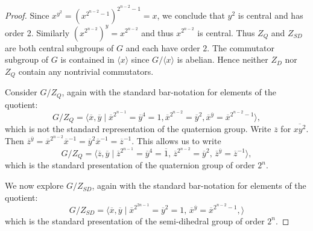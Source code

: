 \documentclass[10pt,a4paper]{amsart}
\begin{document}
\begin{proof}
    Since $x^{y^2} = (x^{2^{n-2}-1})^{2^{n-2}-1} = x$, we conclude that $y^2$ is central and has order 2. Similarly $({x^{2^{n-2}}})^y = x^{2^{n-2}}$ and thus $x^{2^{n-2}}$ is central. Thus $Z_Q$ and $Z_{SD}$ are both central subgroups of $G$ and each have order $2$. The commutator subgroup of $G$ is contained in $\langle x \rangle$ since $G/\langle x \rangle$ is abelian. Hence neither $Z_D$ nor $Z_Q$ contain any nontrivial commutators. 

Consider $G/Z_Q$, again with the standard bar-notation for elements of the quotient: 
\[G/Z_Q = \langle \overline{x},\overline{y}\;|\; \overline{x}^{2^{n-1}} = \overline{y}^{4} = 1, \overline{x}^{2^{n-2}}=\overline{y}^2, \overline{x}^{\overline{y}} = \overline{x}^{2^{n-2}-1}\rangle ,\] which is not the standard representation of the quaternion group. Write  $\overline{z}$ for $\overline{xy^2}$. Then $\overline{z}^{\overline{y}} = \overline{x}^{2^{n-2}}\overline{x}^{-1} = \overline{y}^2 \overline{x}^{-1} = \overline{z}^{-1}$. This allows us to write
\[G/Z_Q = \langle \overline{z}, \overline{y} \; | \; \overline{z}^{2^{n-1}} = \overline{y}^4 = \overline{1}, \,\overline{z}^{2^{n-2}} = \overline{y}^2,\, \overline{z}^{\overline{y}} = \overline{z}^{-1} \rangle,\] which is the standard presentation of the quaternion group of order $2^n$. 

We now explore $G/Z_{SD}$, again with the standard bar-notation for elements of the quotient:
\[
G/Z_{SD} = \langle \overline{x}, \overline{y} \; | \; \overline{x}^{2^{2n-1}} = \overline{y}^2 = 1,\, \overline{x}^{\overline{y}} = \overline{x}^{2^{n-2}-1},\rangle 
\] which is the standard presentation of the semi-dihedral group of order $2^n$. 
%
\end{proof}
\end{document}
